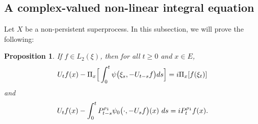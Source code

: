 \documentclass[12pt,a4paper]{amsart}
\theoremstyle{plain}
\newtheorem{prop}[thm]{Proposition}
\theoremstyle{definition}
\numberwithin{equation}{section}
\begin{document}
\subsection{A complex-valued non-linear integral equation}
    Let $X$ be a non-persistent superprocess.
    In this subsection, we will prove the following:
\begin{prop}
\label{prop: complex FKPP-equation}
    If $f\in L_2(\xi)$,  then for all $t\geq 0$ and $x\in E$,
\begin{equation}
\label{eq: complex FKPP-equation}
    U_tf(x) - \Pi_x \Big[\int_0^t \psi\big(\xi_s, - U_{t-s}f\big) ds \Big]
    \\= i \Pi_x [f(\xi_t)]
\end{equation}
    and
\begin{equation}
\label{eq: complex FKPP-equation with FK-transform}
    U_tf(x) -  \int_0^t P_{t-s}^{\rho_1} \psi_0\big(\cdot,-U_sf\big) (x)~ds
    \\= iP_t^{\rho_1} f(x).
\end{equation}
\end{prop}
\end{document}
